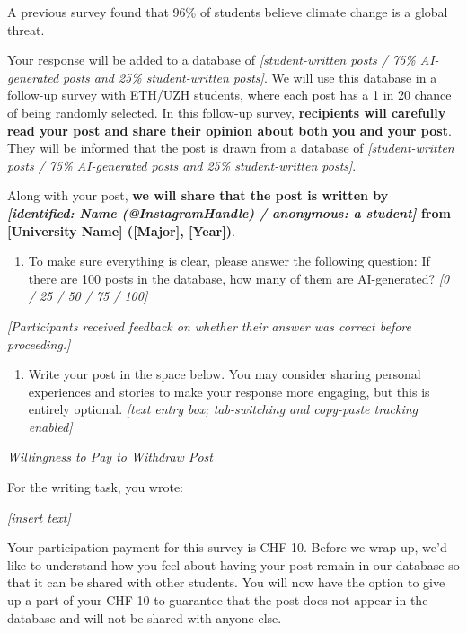 \documentclass[12pt,notitlepage]{article}
\theoremstyle{plain}
\theoremstyle{plain}
\theoremstyle{definition}
\theoremstyle{definition}
\theoremstyle{assumption}
\theoremstyle{plain}
\theoremstyle{plain}
\theoremstyle{plain}
\theoremstyle{plain}
\theoremstyle{definition}%
\theoremstyle{plain}
\theoremstyle{plain}
\theoremstyle{plain}
\theoremstyle{plain}
\begin{document}
A previous survey found that 96\% of students believe climate change is a global threat.

Your response will be added to a database of \emph{[student-written posts / 75\% AI-generated posts and 25\% student-written posts]}. We will use this database in a follow-up survey with ETH/UZH students, where each post has a 1 in 20 chance of being randomly selected. In this follow-up survey, \textbf{recipients will carefully read your post and share their opinion about both you and your post}. They will be informed that the post is drawn from a database of \emph{[student-written posts / 75\% AI-generated posts and 25\% student-written posts]}.

Along with your post, \textbf{we will share that the post is written by \emph{[identified: Name (@InstagramHandle) / anonymous: a student]} from [University Name] ([Major], [Year])}.

\begin{enumerate}
\item To make sure everything is clear, please answer the following question: If there are 100 posts in the database, how many of them are AI-generated? \emph{[0 / 25 / 50 / 75 / 100]}
\end{enumerate}

\emph{[Participants received feedback on whether their answer was correct before proceeding.]}

\begin{enumerate}
\item Write your post in the space below. You may consider sharing personal experiences and stories to make your response more engaging, but this is entirely optional. \emph{[text entry box; tab-switching and copy-paste tracking enabled]}
\end{enumerate}

\vspace{12pt}
\emph{Willingness to Pay to Withdraw Post}

For the writing task, you wrote:

\emph{[insert text]}

Your participation payment for this survey is CHF 10. Before we wrap up, we'd like to understand how you feel about having your post remain in our database so that it can be shared with other students. You will now have the option to give up a part of your CHF 10 to guarantee that the post does not appear in the database and will not be shared with anyone else.
\end{document}
